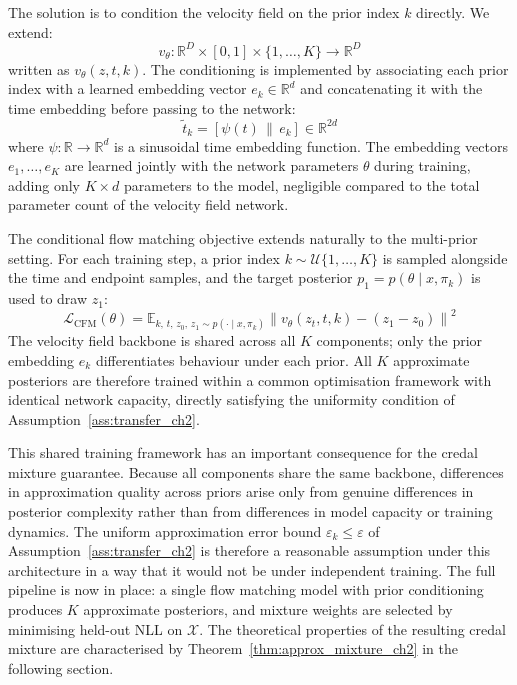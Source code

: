     The solution is to condition the velocity field on the prior index $k$ directly. We extend:
    \begin{equation}
        v_\theta : \mathbb{R}^D \times [0,1] \times \{1, \ldots, K\} \to \mathbb{R}^D
    \end{equation}
    written as $v_\theta(z, t, k)$. The conditioning is implemented by associating each prior index with a learned embedding vector $e_k \in \mathbb{R}^d$ and concatenating it with the time embedding before passing to the network:
    \begin{equation}
        \tilde{t}_k = [\psi(t) \,\|\, e_k] \in \mathbb{R}^{2d}
        \label{eq:prior_embed}
    \end{equation}
    where $\psi : \mathbb{R} \to \mathbb{R}^d$ is a sinusoidal time embedding function. The embedding vectors $e_1, \ldots, e_K$ are learned jointly with the network parameters $\theta$ during training, adding only $K \times d$ parameters to the model, negligible compared to the total parameter count of the velocity field network.

    The conditional flow matching objective extends naturally to the multi-prior setting. For each training step, a prior index $k \sim \mathcal{U}\{1, \ldots, K\}$ is sampled alongside the time and endpoint samples, and the target posterior $p_1 = p(\theta \mid x, \pi_k)$ is used to draw $z_1$:
    \begin{equation}
        \mathcal{L}_\text{CFM}(\theta) = \mathbb{E}_{k,\, t,\, z_0,\, z_1 \sim p(\cdot \mid x, \pi_k)} \left\| v_\theta(z_t, t, k) - (z_1 - z_0) \right\|^2
        \label{eq:cfm_conditioned}
    \end{equation}
    The velocity field backbone is shared across all $K$ components; only the prior embedding $e_k$ differentiates behaviour under each prior. All $K$ approximate posteriors are therefore trained within a common optimisation framework with identical network capacity, directly satisfying the uniformity condition of Assumption~\ref{ass:transfer_ch2}.

    This shared training framework has an important consequence for the credal mixture guarantee. Because all components share the same backbone, differences in approximation quality across priors arise only from genuine differences in posterior complexity rather than from differences in model capacity or training dynamics. The uniform approximation error bound $\varepsilon_k \leq \varepsilon$ of Assumption~\ref{ass:transfer_ch2} is therefore a reasonable assumption under this architecture in a way that it would not be under independent training. The full pipeline is now in place: a single flow matching model with prior conditioning produces $K$ approximate posteriors, and mixture weights are selected by minimising held-out NLL on $\mathcal{X}$. The theoretical properties of the resulting credal mixture are characterised by Theorem~\ref{thm:approx_mixture_ch2} in the following section.

